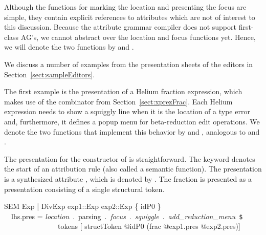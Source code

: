 Although the functions for marking the location and presenting the focus are simple, they contain explicit references to attributes which are not of interest to this discussion. Because the attribute grammar compiler does not support first-class AG's, we cannot abstract over the  location and focus functions yet. Hence, we will denote the two functions by  and . 



We discuss a number of examples from the presentation sheets of the editors in Section~\ref{sect:sampleEditors}.


The first example is the presentation of a Helium fraction expression, which makes use of the  combinator from Section~\ref{sect:xprezFrac}. Each Helium expression needs to show a squiggly line when it is the location of a type error and, furthermore, it defines a popup menu for beta-reduction edit operations. We denote the two functions that implement this behavior by  and , analogous to  and . 

The presentation for the  constructor of  is straightforward. 
The  keyword denotes the start of an attribution rule (also called a semantic function). The presentation is a synthesized attribute , which is denoted by . The fraction is presented as a  presentation consisting of a single structural token.


\ttfamily\begin{small}\begin{tabbing}
SEM Exp | DivExp exp1::Exp exp2::Exp \{ idP0 \}\\
~~lhs.pres = {\em location}~.~parsing~.~{\em focus}~.~{\em squiggle}~.~{\em add\_reduction\_menu}~\verb|$|\\
~~~~~~~~~~~~~~~tokens [ structToken @idP0 (frac @exp1.pres @exp2.pres)]
\end{tabbing}\end{small}\rmfamily

